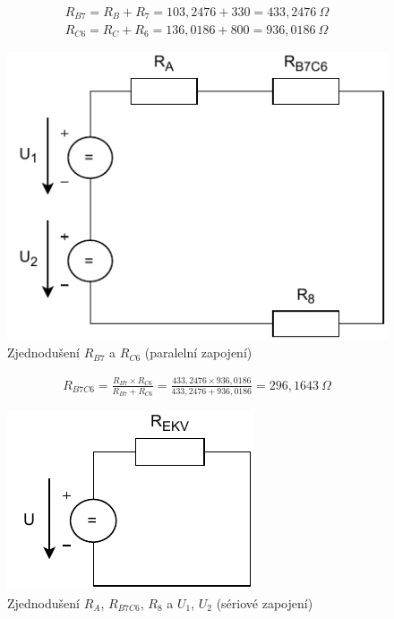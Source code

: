 \begin{center}
    \begin{gather*}
        R_{B7} = R_B + R_7 = 103,2476 + 330 = 433,2476 \: \Omega \\
        R_{C6} = R_C + R_6 = 136,0186 + 800 = 936,0186 \: \Omega
    \end{gather*}
\end{center}

\begin{figure}[h]
    \centering
    \includegraphics[scale=0.8,keepaspectratio]{fig/Pr1_krok5.pdf}
    \caption{Zjednodušení $R_{B7}$ a $R_{C6}$ (paralelní zapojení)}
    \label{pic:Pr1_krok5}
\end{figure}

\begin{center}
    \begin{gather*}
        R_{B7C6} = \frac{R_{B7} \times R_{C6}}{R_{B7}+R_{C6}} = \frac{433,2476 \times 936,0186}{433,2476+936,0186} = 296,1643 \: \Omega
    \end{gather*}
\end{center}

\begin{figure}[h]
    \centering
    \includegraphics[scale=0.8,keepaspectratio]{fig/Pr1_krok6.pdf}
    \caption{Zjednodušení $R_A$, $R_{B7C6}$, $R_8$ a $U_1$, $U_2$ (sériové zapojení)}
    \label{pic:Pr1_krok6}
\end{figure}

